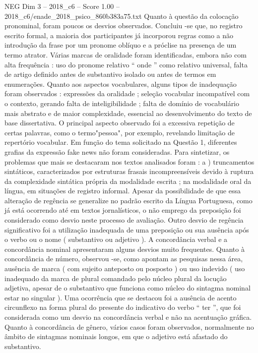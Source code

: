 \begin{textsample}{NEG Dim 3 – 2018\_c6 – Score 1.00 – 2018\_c6/enade\_2018\_psico\_860b383a75.txt}
Quanto à questão da colocação pronominal, foram poucos os desvios observados.
Concluiu -se que, no registro escrito formal, a maioria dos participantes já incorporou regras como a não introdução da frase por um pronome oblíquo e a próclise na presença de um termo atrator.
Várias marcas de oralidade foram identificadas, embora não com alta frequência : uso do pronome relativo “ onde ” como relativo universal, falta de artigo definido antes de substantivo isolado ou antes de termos em enumerações.
Quanto aos aspectos vocabulares, alguns tipos de inadequação foram observados : expressões da oralidade ; seleção vocabular incompatível com o contexto, gerando falta de inteligibilidade ; falta de domínio de vocabulário mais abstrato e de maior complexidade, essencial ao desenvolvimento do texto de base dissertativa.
O principal aspecto observado foi a excessiva repetição de certas palavras, como o termo"pessoa", por exemplo, revelando limitação de repertório vocabular.
Em função do tema solicitado na Questão 1, diferentes grafias da expressão fake news não foram consideradas.
Para sintetizar, os problemas que mais se destacaram nos textos analisados foram : a ) truncamentos sintáticos, caracterizados por estruturas frasais incompreensíveis devido à ruptura da complexidade sintática própria da modalidade escrita ; na modalidade oral da língua, em situações de registro informal.
Apesar da possibilidade de que essa alteração de regência se generalize no padrão escrito da Língua Portuguesa, como já está ocorrendo até em textos jornalísticos, o não emprego da preposição foi considerado como desvio neste processo de avaliação.
Outro desvio de regência significativo foi a utilização inadequada de uma preposição ou sua ausência após o verbo ou o nome ( substantivo ou adjetivo ).
A concordância verbal e a concordância nominal apresentaram alguns desvios muito frequentes.
Quanto à concordância de número, observou -se, como apontam as pesquisas nessa área, ausência de marca ( com sujeito anteposto ou posposto ) ou uso indevido ( uso inadequado da marca de plural comandado pelo núcleo plural da locução adjetiva, apesar de o substantivo que funciona como núcleo do sintagma nominal estar no singular ).
Uma ocorrência que se destacou foi a ausência de acento circunflexo na forma plural do presente do indicativo do verbo “ ter ”, que foi considerada como um desvio na concordância verbal e não na acentuação gráfica.
Quanto à concordância de gênero, vários casos foram observados, normalmente no âmbito de sintagmas nominais longos, em que o adjetivo está afastado do substantivo.

\end{textsample}

